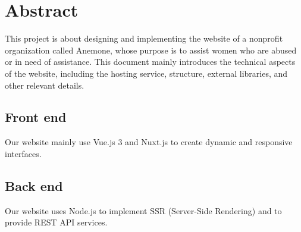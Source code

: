 \section{Abstract}
This project is about designing and implementing the website of a nonprofit organization called Anemone,
whose purpose is to assist women who are abused or in need of assistance. This document mainly introduces the technical aspects of the website, including the hosting service, structure, external libraries, and other relevant details.
\subsection{Front end}
Our website mainly use Vue.js 3 and Nuxt.js to create dynamic and responsive interfaces.
\subsection{Back end}
Our website uses Node.js to implement SSR (Server-Side Rendering) and to provide REST API services.
